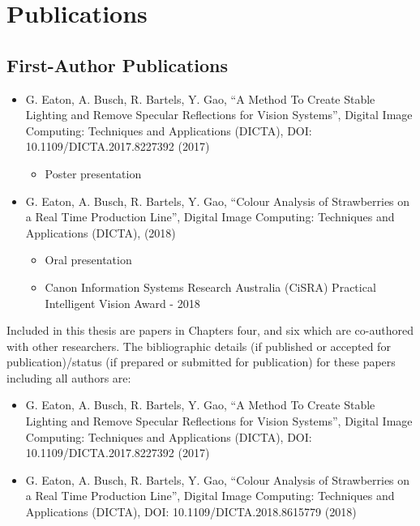 \documentclass[fleqn,twoside,12pt]{report}
\begin{document}
\chapter*{Publications}


\section{First-Author Publications}

\begin{itemize}
	\item{G. Eaton, A. Busch, R. Bartels, Y. Gao, “A Method To Create Stable Lighting and Remove Specular Reflections for Vision Systems”, Digital Image Computing: Techniques and Applications (DICTA), DOI: 10.1109/DICTA.2017.8227392 (2017)}
	\begin{itemize}
		\item Poster presentation 
	\end{itemize}
	\quad
	\item{G. Eaton, A. Busch, R. Bartels, Y. Gao, “Colour Analysis of Strawberries on a Real Time Production Line”, Digital Image Computing: Techniques and Applications (DICTA), (2018)}
	\begin{itemize}
		\item Oral presentation 
		\item Canon Information Systems Research Australia (CiSRA) Practical Intelligent Vision Award - 2018
	\end{itemize}
\end{itemize}  

Included in this thesis are papers in Chapters four, and six which are co-authored
with other researchers. The bibliographic details (if published or accepted for publication)/status (if prepared or submitted for publication) for these papers including all authors are:

\begin{itemize}
	\item{G. Eaton, A. Busch, R. Bartels, Y. Gao, “A Method To Create Stable Lighting and Remove Specular Reflections for Vision Systems”, Digital Image Computing: Techniques and Applications (DICTA), DOI: 10.1109/DICTA.2017.8227392 (2017)}
	\quad
	\item{G. Eaton, A. Busch, R. Bartels, Y. Gao, “Colour Analysis of Strawberries on a Real Time Production Line”, Digital Image Computing: Techniques and Applications (DICTA), DOI: 10.1109/DICTA.2018.8615779 (2018)}
\end{itemize}  
\end{document}
